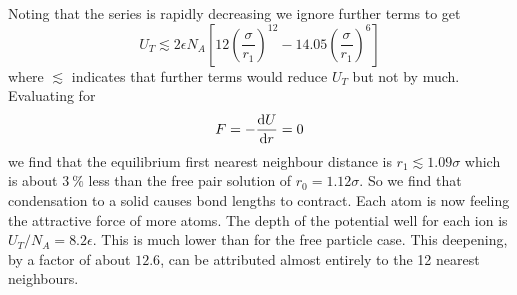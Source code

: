     Noting that the series is rapidly decreasing we ignore further terms to get
    \[U_T \lesssim 2\epsilon N_A \left[12\left(\frac{\sigma}{r_1}\right)^{12} - 14.05\left(\frac{\sigma}{r_1}\right)^6\right]\]
    where \(\lesssim\) indicates that further terms would reduce \(U_T\) but not by much.
    Evaluating for
    \[F = -\dv{U}{r} = 0\]
    we find that the equilibrium first nearest neighbour distance is \(r_1\lesssim 1.09\sigma\) which is about \(\SI{3}{\%}\) less than the free pair solution of \(r_0 = 1.12\sigma\).
    So we find that condensation to a solid causes bond lengths to contract.
    Each atom is now feeling the attractive force of more atoms.
    The depth of the potential well for each ion is \(U_T/N_A = 8.2\epsilon\).
    This is much lower than for the free particle case.
    This deepening, by a factor of about \(12.6\), can be attributed almost entirely to the 12 nearest neighbours.
    
